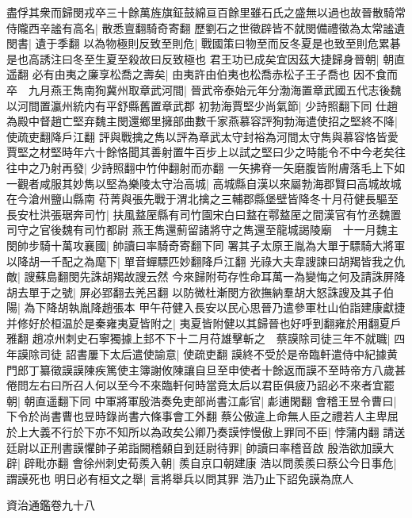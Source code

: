 盡俘其衆而歸閔戎卒三十餘萬旌旗鉦鼓綿亘百餘里雖石氏之盛無以過也故晉散騎常侍隴西辛謐有高名|{
	散悉亶翻騎奇寄翻}
歷劉石之世徵辟皆不就閔備禮徵為太常謐遺閔書|{
	遺于季翻}
以為物極則反致至則危|{
	戰國策曰物至而反冬夏是也致至則危累碁是也高誘注曰冬至生夏至殺故曰反致極也}
君王功已成矣宜因茲大捷歸身晉朝|{
	朝直遥翻}
必有由夷之廉享松喬之壽矣|{
	由夷許由伯夷也松喬赤松子王子喬也}
因不食而卒　九月燕王雋南狥冀州取章武河間|{
	晉武帝泰始元年分渤海置章武國五代志後魏以河間置瀛州統内有平舒縣舊置章武郡}
初勃海賈堅少尚氣節|{
	少詩照翻下同}
仕趙為殿中督趙亡堅弃魏主閔還鄉里擁部曲數千家燕慕容評狥勃海遣使招之堅終不降|{
	使疏吏翻降戶江翻}
評與戰擒之雋以評為章武太守封裕為河間太守雋與慕容恪皆愛賈堅之材堅時年六十餘恪聞其善射置牛百步上以試之堅曰少之時能令不中今老矣往往中之乃射再發|{
	少詩照翻中竹仲翻射而亦翻}
一矢拂脊一矢磨腹皆附膚落毛上下如一觀者咸服其妙雋以堅為樂陵太守治高城|{
	高城縣自漢以來屬勃海郡賢曰高城故城在今滄州鹽山縣南}
苻菁與張先戰于渭北擒之三輔郡縣堡壁皆降冬十月苻健長驅至長安杜洪張琚奔司竹|{
	扶風盩厔縣有司竹園宋白曰盩在鄠盩厔之間漢官有竹丞魏置司守之官後魏有司竹都尉}
燕王雋還薊留諸將守之雋還至龍城謁陵廟　十一月魏主閔帥步騎十萬攻襄國|{
	帥讀曰率騎奇寄翻下同}
署其子太原王胤為大單于驃騎大將軍以降胡一千配之為麾下|{
	單音蟬驃匹妙翻降戶江翻}
光祿大夫韋謏諫曰胡羯皆我之仇敵|{
	謏蘇島翻閔先誅胡羯故謏云然}
今來歸附苟存性命耳萬一為變悔之何及請誅屏降胡去單于之號|{
	屏必郢翻去羌呂翻}
以防微杜漸閔方欲撫納羣胡大怒誅謏及其子伯陽|{
	為下降胡執胤降趙張本}
甲午苻健入長安以民心思晉乃遣參軍杜山伯詣建康獻捷并修好於桓温於是秦雍夷夏皆附之|{
	夷夏皆附健以其歸晉也好呼到翻雍於用翻夏戶雅翻}
趙凉州刺史石寧獨據上邽不下十二月苻雄擊斬之　蔡謨除司徒三年不就職|{
	四年謨除司徒}
詔書屢下太后遣使諭意|{
	使疏吏翻}
謨終不受於是帝臨軒遣侍中紀據黄門郎丁纂徵謨謨陳疾篤使主簿謝攸陳讓自旦至申使者十餘返而謨不至時帝方八歲甚倦問左右曰所召人何以至今不來臨軒何時當竟太后以君臣俱疲乃詔必不來者宜罷朝|{
	朝直遥翻下同}
中軍將軍殷浩奏免吏部尚書江虨官|{
	虨逋閑翻}
會稽王昱令曹曰|{
	下令於尚書曹也昱時錄尚書六條事會工外翻}
蔡公傲違上命無人臣之禮若人主卑屈於上大義不行於下亦不知所以為政矣公卿乃奏謨悖慢傲上罪同不臣|{
	悖蒲内翻}
請送廷尉以正刑書謨懼帥子弟詣闕稽顙自到廷尉待罪|{
	帥讀曰率稽音啟}
殷浩欲加謨大辟|{
	辟毗亦翻}
會徐州刺史荀羨入朝|{
	羨自京口朝建康}
浩以問羨羨曰蔡公今日事危|{
	謂謨死也}
明日必有桓文之舉|{
	言將舉兵以問其罪}
浩乃止下詔免謨為庶人

資治通鑑卷九十八
